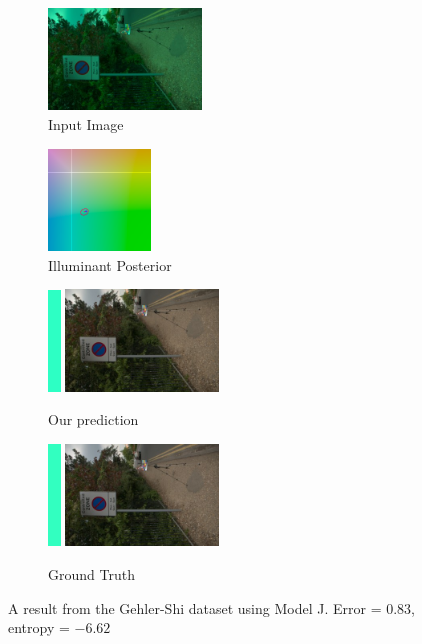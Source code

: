 \documentclass[10pt,twocolumn,letterpaper]{article}
\begin{document}
\begin{figure}[!]
\centering
  \begin{subfigure}[!]{1.7in}
    \includegraphics[width=1.6in]{figures/results/gehlershi/00000170_input.jpg}
    \caption{\footnotesize Input Image}
  \end{subfigure}
  \begin{subfigure}[!]{1.17in}
    \includegraphics[width=1.07in]{figures/results/gehlershi/00000170_chroma.png}
    \caption{\footnotesize Illuminant Posterior}
  \end{subfigure}
\begin{subfigure}[!]{1.9in}
    \includegraphics[width=0.133in]{figures/results/gehlershi/00000170_illum.png}\!
    \includegraphics[width=1.6in]{figures/results/gehlershi/00000170_prediction.jpg}
    \caption{\footnotesize Our prediction}
  \end{subfigure}
  \begin{subfigure}[!]{1.9in}
    \includegraphics[width=0.133in]{figures/results/gehlershi/00000170_illum_true.png}\!
    \includegraphics[width=1.6in]{figures/results/gehlershi/00000170_true.jpg}
    \caption{\footnotesize Ground Truth}
  \end{subfigure}
  \caption{
    A result from the Gehler-Shi dataset using Model J. Error = $0.83$\textdegree, entropy = $-6.62$
    \label{fig:results5}
  }
\end{figure}
\end{document}

